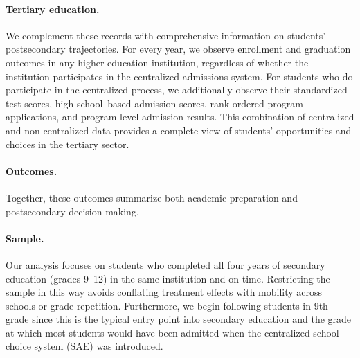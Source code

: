 \paragraph{Tertiary education.} 
We complement these records with comprehensive information on students' postsecondary trajectories. For every year, we observe enrollment and graduation outcomes in any higher-education institution, regardless of whether the institution participates in the centralized admissions system. For students who do participate in the centralized process, we additionally observe their standardized test scores, high-school–based admission scores, rank-ordered program applications, and program-level admission results. This combination of centralized and non-centralized data provides a complete view of students' opportunities and choices in the tertiary sector.

\paragraph{Outcomes.} 
 Together, these outcomes summarize both academic preparation and postsecondary decision-making.

\paragraph{Sample.} 
Our analysis focuses on students who completed all four years of secondary education (grades 9--12) in the same institution and on time. Restricting the sample in this way avoids conflating treatment effects with mobility across schools or grade repetition.  Furthermore, we begin following students in 9th grade since this is the typical entry point into secondary education and the grade at which most students would have been admitted when the centralized school choice system (SAE) was introduced. 

